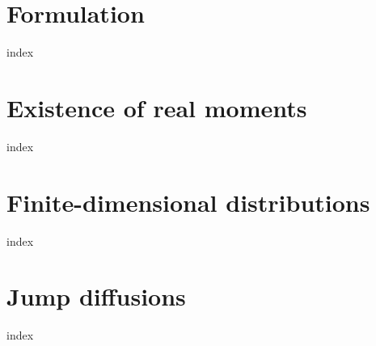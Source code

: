\label{affine-processes:introduction}


\section{Formulation}
\label{affine-processes:formulation}
{index}

\section{Existence of real moments}
\label{affine-processes:existence}
{index}

\section{Finite-dimensional distributions}
\label{affine-processes:fdds}
{index}

\section{Jump diffusions}
\label{affine-processes:jump-diffusions}
{index}
